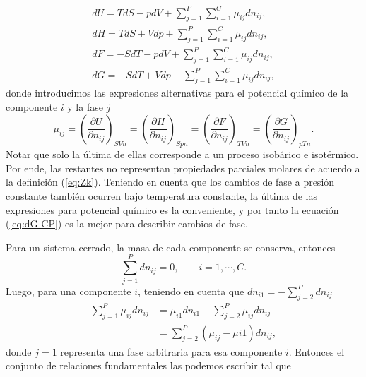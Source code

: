 \documentclass[openany]{book}
\begin{document}
\begin{gather*}
	dU=TdS-pdV+\sum_{j=1}^{P}\sum_{i=1}^{C}\mu_{ij}dn_{ij},\\
	dH=TdS+Vdp+\sum_{j=1}^{P}\sum_{i=1}^{C}\mu_{ij}dn_{ij},\\
	dF=-SdT-pdV+\sum_{j=1}^{P}\sum_{i=1}^{C}\mu_{ij}dn_{ij},\\
	dG=-SdT+Vdp+\sum_{j=1}^{P}\sum_{i=1}^{C}\mu_{ij}dn_{ij},
\end{gather*}
donde introducimos las expresiones alternativas para el potencial químico de la componente $i$ y la fase $j$
\begin{equation*}
	\mu_{ij}=\left(\frac{\partial U}{\partial n_{ij}}\right)_{SVn}=\left(\frac{\partial H}{\partial n_{ij}}\right)_{Spn}=\left(\frac{\partial F}{\partial n_{ij}}\right)_{TVn}=\left(\frac{\partial G}{\partial n_{ij}}\right)_{pTn}.
\end{equation*}
Notar que solo la última de ellas corresponde a un proceso isobárico e isotérmico. Por ende, las restantes no representan propiedades parciales molares de acuerdo a la definición (\ref{eq:Zk}). Teniendo en cuenta que los cambios de fase a presión constante también ocurren bajo temperatura constante, la última de las expresiones para potencial químico es la conveniente, y por tanto la ecuación (\ref{eq:dG-CP}) es la mejor para describir cambios de fase.
\par Para un sistema cerrado, la masa de cada componente se conserva, entonces
\begin{equation*}
	\sum_{j=1}^{P}dn_{ij}=0,\qquad i=1,\cdots,C.
\end{equation*}
Luego, para una componente $i$, teniendo en cuenta que $dn_{i1}=-\sum_{j=2}^{P}dn_{ij}$
\begin{align*}
	\sum_{j=1}^{P}\mu_{ij}dn_{ij} & =\mu_{i1}dn_{i1}+\sum_{j=2}^{P}\mu_{ij}dn_{ij} \\
	                              & =\sum_{j=2}^{P}(\mu_{ij}-\mu{i1})dn_{ij},
\end{align*}
donde $j=1$ representa una fase arbitraria para esa componente $i$. Entonces el conjunto de relaciones fundamentales las podemos escribir tal que
\end{document}
